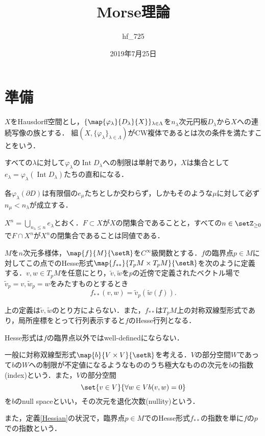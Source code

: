 \documentclass[uplatex]{jsarticle}
\title{Morse理論}
\author{hf\_725}
\date{2019年7月25日}
\DeclareMathOperator{\Int}{Int}
\begin{document}
\maketitle

\section{準備}
\begin{definition}
$X$をHausdorff空間とし，$\{\map{\varphi_{\lambda}}{D_{\lambda}}{X}\}_{\lambda\in \Lambda}$を$n_{\lambda}$次元円板$D_{\lambda}$から$X$への連続写像の族とする．
組$(X,\{{\varphi_{\lambda}}\}_{\lambda\in \Lambda})$がCW複体であるとは次の条件を満たすことをいう．
\begin{enumarabicp}
\item すべての$\lambda$に対して$\varphi_{\lambda}$の$\Int D_{\lambda}$への制限は単射であり，$X$は集合として$e_{\lambda} = \varphi_{\lambda}(\Int D_{\lambda})$たちの直和になる．
\item 各$\varphi_{\lambda}(\partial D)$は有限個の$e_{\mu}$たちとしか交わらず，しかもそのような$\mu$に対して必ず$n_{\mu}<n_{\lambda}$が成立する．
\item $X^n = \bigcup_{n_{\lambda}\leq n} e_{\lambda}$とおく．$F\subset X$が$X$の閉集合であることと，すべての$n\in \setZ_{\geq 0}$で$F\cap X^n$が$X^n$の閉集合であることは同値である．
\end{enumarabicp}
\end{definition}
\begin{definition}\label{Hessian}
$M$を$n$次元多様体，$\map{f}{M}{\setR}$を$C^{\infty}$級関数とする．$f$の臨界点$p\in M$に対してこの点でのHesse形式$\map{f_{\ast \ast}}{T_p M\times T_p M}{\setR}$を次のように定義する．$v,w\in T_p M$を任意にとり，$\tilde{v},\tilde{w}$を$p$の近傍で定義されたベクトル場で$\tilde{v}_p = v,\tilde{w}_p = w$をみたすものとするとき
\[ f_{\ast \ast}(v,w) = \tilde{v}_p(\tilde{w}(f)). \]
\end{definition}

\begin{proposition}
上の定義は$\tilde{v},\tilde{w}$のとり方によらない．また，$f_{\ast \ast}$は$T_p M$上の対称双線型形式であり，局所座標をとって行列表示すると$f$のHesse行列となる．
\end{proposition}

\begin{remark}
Hesse形式は$f$の臨界点以外ではwell-definedにならない．
\end{remark}

\begin{definition}
一般に対称双線型形式$\map{b}{V\times V}{\setR}$を考える．$V$の部分空間$W$であって$b$の$W$への制限が不定値になるようなもののうち極大なものの次元を$b$の指数(index)という．また，$V$の部分空間
\[ \set{v\in V}{\forall w\in V b(v,w) = 0} \]
を$b$のnull spaceといい，その次元を退化次数(nullity)という．

また，定義\ref{Hessian}の状況で，臨界点$p\in M$でのHesse形式$f_{\ast \ast}$の指数を単に$f$の$p$での指数という．
\end{definition}
\end{document}
